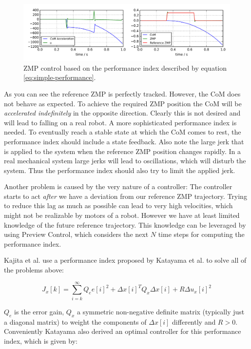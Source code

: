 \documentclass[english,ngerman]{KITreprt}
\begin{document}
\begin{figure}[tb]
\vspace*{-1em}
\includegraphics[width=\textwidth]{images/simple_zmp_control.png}
\caption{ZMP control based on the performance index described by equation \ref{eq:simple-performance}.}
\label{img:simple-zmp-control}
\end{figure}

As you can see the reference ZMP is perfectly tracked. However, the CoM
does not behave as expected. To achieve the required ZMP position the
CoM will be \emph{accelerated indefinitely} in the opposite direction.
Clearly this is not desired and will lead to falling on a real robot. A
more sophisticated performance index is needed. To eventually reach a
stable state at which the CoM comes to rest, the performance index
should include a state feedback. Also note the large jerk that is
applied to the system when the reference ZMP position changes rapidly.
In a real mechanical system large jerks will lead to oscillations, which
will disturb the system. Thus the performance index should also try to
limit the applied jerk.

Another problem is caused by the very nature of a controller: The
controller starts to act \emph{after} we have a deviation from our
reference ZMP trajectory. Trying to reduce this lag as much as possible
can lead to very high velocities, which might not be realizable by
motors of a robot. However we have at least limited knowledge of the
future reference trajectory. This knowledge can be leveraged by using
Preview Control, which considers the next $N$ time steps for computing
the performance index.

Kajita et al. use a performance index proposed by Katayama et al.
\cite{katayama1985design} to solve all of the problems above:

\begin{equation}
J_x[k] = \sum^{\infty}_{i=k} Q_e e[i]^2 + \Delta x[i]^T Q_x \Delta x[i] + R \Delta u_x[i]^2
\end{equation}

$Q_e$ is the error gain, $Q_x$ a symmetric non-negative definite matrix
(typically just a diagonal matrix) to weight the components of
$\Delta x[i]$ differently and $R > 0$. Conveniently Katayama also
derived an optimal controller for this performance index, which is given
by:
\end{document}
